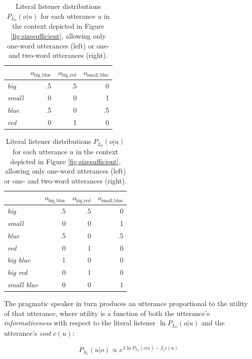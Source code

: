 \documentclass[11pt]{article}
\newcommand{\figref}[1]{Figure \ref{#1}}
\begin{document}
\begin{table}
\caption{Literal listener distributions $P_{L_0}(o | u)$ for each utterance $u$ in the context depicted in \figref{fig:sizesufficient}, allowing only one-word utterances (left) or one- and two-word utterances (right).}
\begin{tabular}{l r r r}
\toprule
& $o_{\textrm{big\_blue}}$ & $o_{\textrm{big\_red}}$ & $o_{\textrm{small\_blue}}$ \\
\midrule
\emph{big} & .5 & .5 & 0\\
\emph{small} & 0 & 0 & 1\\
\emph{blue} & .5 & 0 & .5\\
\emph{red} & 0 & 1 & 0\\
\bottomrule
\end{tabular}
\begin{tabular}{l r r r}
\toprule
& $o_{\textrm{big\_blue}}$ & $o_{\textrm{big\_red}}$ & $o_{\textrm{small\_blue}}$ \\
\midrule
\emph{big} & .5 & .5 & 0\\
\emph{small} & 0 & 0 & 1\\
\emph{blue} & .5 & 0 & .5\\
\emph{red} & 0 & 1 & 0\\
\emph{big blue} & 1 & 0 & 0\\
\emph{big red} & 0 & 1 & 0\\
\emph{small blue} & 0 & 0 & 1\\
\bottomrule
\end{tabular}
\label{tab:detliteral}
\end{table}

The pragmatic speaker in turn produces an utterance proportional to the utility of that utterance, where utility is a function of both the utterance's \emph{informativeness}  with respect to the literal listener $\ln P_{L_0}(o | u)$ and the utterance's \emph{cost} $c(u)$:

\begin{equation}
P_{S_1}(u | o) \propto e^{\lambda \ln P_{L_0}(o | u) - \beta_c c(u)}
\end{equation}
\end{document}
